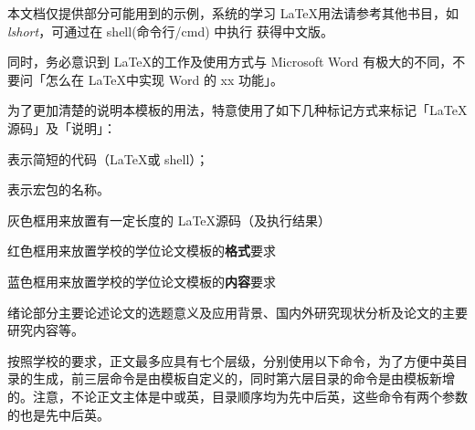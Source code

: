 


本文档仅提供部分可能用到的示例，系统的学习 \LaTeX 用法请参考其他书目，如 \emph{lshort}，可通过在 shell(命令行/cmd) 中执行  获得中文版。

同时，务必意识到 \LaTeX 的工作及使用方式与 Microsoft Word 有极大的不同，不要问「怎么在 \LaTeX 中实现 Word 的 xx 功能」。


为了更加清楚的说明本模板的用法，特意使用了如下几种标记方式来标记「\LaTeX 源码」及「说明」：

表示简短的代码（\LaTeX 或 shell）；

表示宏包的名称。

\begin{tcolorbox}
  灰色框用来放置有一定长度的 \LaTeX 源码（及执行结果）
\end{tcolorbox}

\begin{tcolorbox}[colback=red!5!white,colframe=red!75!black]
  红色框用来放置学校的学位论文模板的\textbf{格式}要求
\end{tcolorbox}

\begin{tcolorbox}[colback=blue!5!white,colframe=blue!75!black]
  蓝色框用来放置学校的学位论文模板的\textbf{内容}要求
\end{tcolorbox}


\clearpage

\begin{tcolorbox}[colback=blue!5!white,colframe=blue!75!black,title=绪论部分的要求]
  绪论部分主要论述论文的选题意义及应用背景、国内外研究现状分析及论文的主要研究内容等。
\end{tcolorbox}



按照学校的要求，正文最多应具有七个层级，分别使用以下命令，为了方便中英目录的生成，前三层命令是由模板自定义的，同时第六层目录的命令是由模板新增的。注意，不论正文主体是中或英，目录顺序均为先中后英，这些命令有两个参数的也是先中后英。

